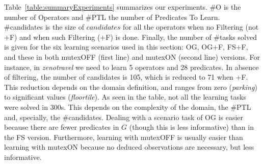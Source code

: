 \documentclass{ecai}
\begin{document}
Table~\ref{table:summaryExperiments} summarizes our experiments. \#O is the number of Operators and \#PTL the number of Predicates To Learn. \#candidates is the size of $candidates$ for all the operators when no Filtering (not +F) and when such Filtering (+F) is done. 
Finally, the number of \#tasks solved is given for the six learning scenarios used in this section: OG, OG+F, FS+F, and these in both mutexOFF (first line) and mutexON (second line) versions.
For instance, in {\em zenotravel} we need to learn 5 operators and 28 predicates. In absence of filtering, the number of candidates is 105, which is reduced to 71 when +F. This reduction depends on the domain definition, and ranges from zero ({\em parking}) to significant values ({\em floortile}).
As seen in the table, not all the learning tasks were solved in 300s. This depends on the complexity of the domain, the \#PTL and, specially, the \#candidates. Dealing with a scenario task of OG is easier because there are fewer predicates in $G$ (though this is less informative) than in the FS version. Furthermore, learning with mutexOFF is usually easier than learning with mutexON because no deduced observations are necessary, but less informative.
\end{document}
